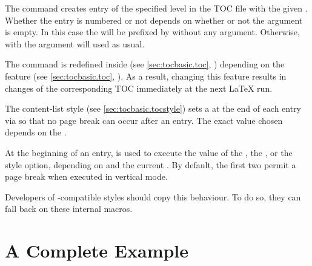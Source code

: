 \begin{Declaration}
\end{Declaration}
The 
command creates entry of the specified level in the TOC file with the given
. Whether the entry is numbered or not depends on whether or
not the  argument is empty. In this case the  will
be prefixed by  without any argument. Otherwise,
 with the  argument will used
as usual.

The  command is redefined inside
 (see \autoref{sec:tocbasic.toc},
) depending on the 
feature (see \autoref{sec:tocbasic.toc},
). As a result, changing this feature
results in changes of the corresponding TOC immediately at the next \LaTeX{}
run.%
\EndIndexGroup


\begin{Declaration}
\end{Declaration}
The 
content-list style (see \autoref{sec:tocbasic.tocstyle}) sets a
 at the end of each entry via
 so that no page break can occur after an
entry. The exact value chosen depends on the .

At the beginning of an entry,  is
used to execute the value of the , the
, or the  style option,
depending on  and the current . By
default, the first two permit a page break when executed in vertical mode.

Developers of -compatible styles should copy this behaviour.
To do so, they can fall back on these internal macros.%
\EndIndexGroup


\section{A Complete Example}

